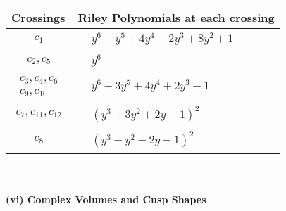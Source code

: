 \documentclass[1p]{elsarticle_modified}
\theoremstyle{definition}
\begin{document}
\begin{tabular}{m{50pt}|m{274pt}}
Crossings & \hspace{64pt}Riley Polynomials at each crossing \\
\hline $$\begin{aligned}c_{1}\end{aligned}$$&$\begin{aligned}
&y^6- y^5+4 y^4-2 y^3+8 y^2+1
\end{aligned}$\\
\hline $$\begin{aligned}c_{2},c_{5}\end{aligned}$$&$\begin{aligned}
&y^6
\end{aligned}$\\
\hline $$\begin{aligned}c_{3},c_{4},c_{6}\\c_{9},c_{10}\end{aligned}$$&$\begin{aligned}
&y^6+3 y^5+4 y^4+2 y^3+1
\end{aligned}$\\
\hline $$\begin{aligned}c_{7},c_{11},c_{12}\end{aligned}$$&$\begin{aligned}
&(y^3+3 y^2+2 y-1)^2
\end{aligned}$\\
\hline $$\begin{aligned}c_{8}\end{aligned}$$&$\begin{aligned}
&(y^3- y^2+2 y-1)^2
\end{aligned}$\\
\hline
\end{tabular}\\~\\
\newpage\flushleft \textbf{(vi) Complex Volumes and Cusp Shapes}
\end{document}
